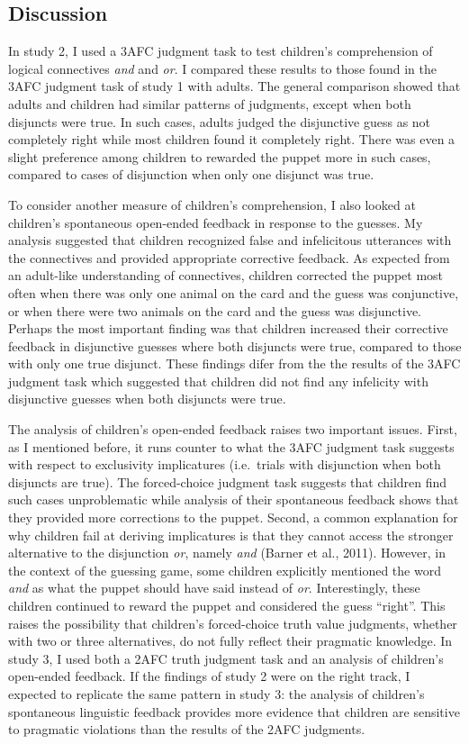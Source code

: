 \documentclass[oneside]{report}
\theoremstyle{definition}
\theoremstyle{definition}
\theoremstyle{definition}
\theoremstyle{remark}
\begin{document}
\subsection{Discussion}\label{discussion-4}

In study 2, I used a 3AFC judgment task to test children's comprehension
of logical connectives \emph{and} and \emph{or}. I compared these
results to those found in the 3AFC judgment task of study 1 with adults.
The general comparison showed that adults and children had similar
patterns of judgments, except when both disjuncts were true. In such
cases, adults judged the disjunctive guess as not completely right while
most children found it completely right. There was even a slight
preference among children to rewarded the puppet more in such cases,
compared to cases of disjunction when only one disjunct was true.

To consider another measure of children's comprehension, I also looked
at children's spontaneous open-ended feedback in response to the
guesses. My analysis suggested that children recognized false and
infelicitous utterances with the connectives and provided appropriate
corrective feedback. As expected from an adult-like understanding of
connectives, children corrected the puppet most often when there was
only one animal on the card and the guess was conjunctive, or when there
were two animals on the card and the guess was disjunctive. Perhaps the
most important finding was that children increased their corrective
feedback in disjunctive guesses where both disjuncts were true, compared
to those with only one true disjunct. These findings difer from the the
results of the 3AFC judgment task which suggested that children did not
find any infelicity with disjunctive guesses when both disjuncts were
true.

The analysis of children's open-ended feedback raises two important
issues. First, as I mentioned before, it runs counter to what the 3AFC
judgment task suggests with respect to exclusivity implicatures
(i.e.~trials with disjunction when both disjuncts are true). The
forced-choice judgment task suggests that children find such cases
unproblematic while analysis of their spontaneous feedback shows that
they provided more corrections to the puppet. Second, a common
explanation for why children fail at deriving implicatures is that they
cannot access the stronger alternative to the disjunction \emph{or},
namely \emph{and} (Barner et al., 2011). However, in the context of the
guessing game, some children explicitly mentioned the word \emph{and} as
what the puppet should have said instead of \emph{or}. Interestingly,
these children continued to reward the puppet and considered the guess
``right''. This raises the possibility that children's forced-choice
truth value judgments, whether with two or three alternatives, do not
fully reflect their pragmatic knowledge. In study 3, I used both a 2AFC
truth judgment task and an analysis of children's open-ended feedback.
If the findings of study 2 were on the right track, I expected to
replicate the same pattern in study 3: the analysis of children's
spontaneous linguistic feedback provides more evidence that children are
sensitive to pragmatic violations than the results of the 2AFC
judgments.
\end{document}
